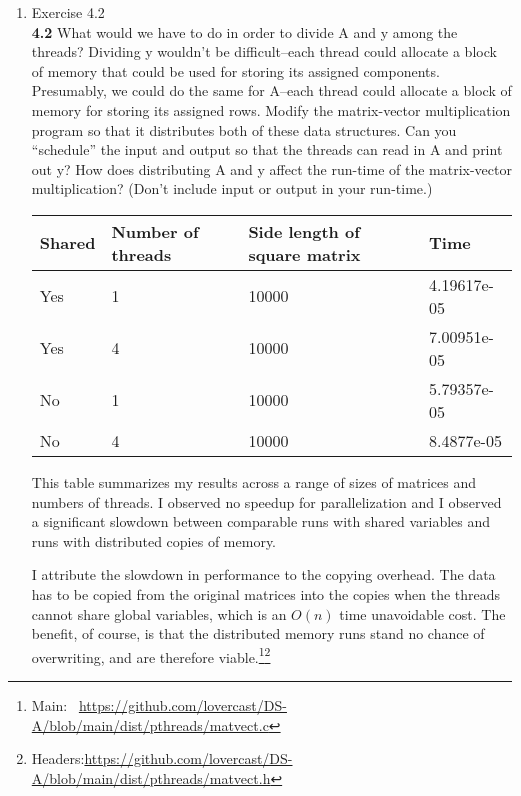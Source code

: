 \documentclass[11pt,epsfig,letterpaper]{article}
\begin{document}
\begin{enumerate}
            \item Exercise 4.2 \\
            {\bf 4.2}\>\> What would we have to do in order to divide A and y among the threads? Dividing y wouldn’t be difficult–each thread could allocate a block of memory that could be used for storing its assigned components. Presumably, we could do the same for A–each thread could allocate a block of memory for storing its assigned rows. Modify the matrix-vector multiplication program so that it distributes both of these data structures. Can you “schedule” the input and output so that the threads can read in A and print out y?
            How does distributing A and y affect the run-time of the matrix-vector multiplication? (Don’t include input or output in your run-time.)
            \vspace{0.5pc}

            \begin{center}
            \begin{tabular}{ | l | l | l | p{5cm} |}
            \hline
            Shared & Number of threads & Side length of square matrix & Time \\ \hline
            Yes & 1 & 10000 & 4.19617e-05
             \\ \hline
            Yes & 4 & 10000 & 7.00951e-05
             \\ \hline
            No & 1 & 10000 &  5.79357e-05
            \\ \hline
            No & 4 & 10000 &  8.4877e-05 \\
            \hline
            \end{tabular}
            \end{center}

            \quad This table summarizes my results across a range of sizes of matrices and numbers of threads. I observed no speedup for parallelization and I observed a significant slowdown between comparable runs with shared variables and runs with distributed copies of memory.

            \quad I attribute the slowdown in performance to the copying overhead. The data has to be copied from the original matrices into the copies when the threads cannot share global variables, which is an $O(n)$ time unavoidable cost. The benefit, of course, is that the distributed memory runs stand no chance of overwriting, and are therefore viable.\footnote{Main:\> \   \url{https://github.com/lovercast/DS-A/blob/main/dist/pthreads/matvect.c}}\footnote{Headers:\url{https://github.com/lovercast/DS-A/blob/main/dist/pthreads/matvect.h}}


\end{enumerate}
\end{document}
